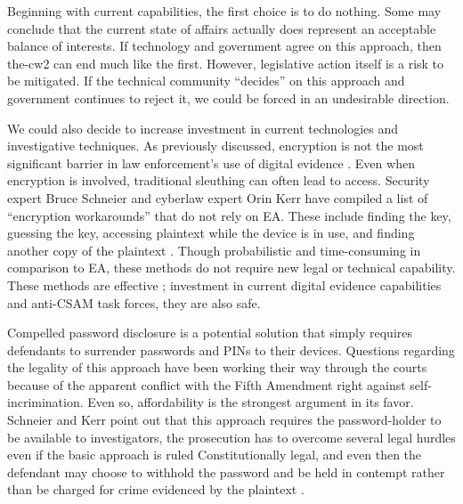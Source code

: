 Beginning with current capabilities, the first choice is to do nothing. Some may conclude that the current state of
affairs actually does represent an acceptable balance of interests. If technology and government agree on this approach,
then \ac{the-cw2} can end much like the first. However, legislative action itself is a risk to be mitigated. If the
technical community ``decides'' on this approach and government continues to reject it, we could be forced in an
undesirable direction.

We could also decide to increase investment in current technologies and investigative techniques. As previously
discussed, encryption is not the most significant barrier in law enforcement's use of digital evidence
\cite{carter_2018}. Even when encryption is involved, traditional sleuthing can often lead to access. Security expert
Bruce Schneier and cyberlaw expert Orin Kerr have compiled a list of ``encryption workarounds'' that do not rely on
\ac{EA}. These include finding the key, guessing the key, accessing plaintext while the device is in use, and finding
another copy of the plaintext \cite{kerr_encryption_2017}. Though probabilistic and time-consuming in comparison to
\ac{EA}, these methods do not require new legal or technical capability. These methods are effective
\cite{greenberg_2018}; investment in current digital evidence capabilities and anti-\ac{CSAM} task forces, they are also
safe.

Compelled password disclosure is a potential solution that simply requires defendants to surrender passwords and
\acp{PIN} to their devices. Questions regarding the legality of this approach have been working their way through the
courts \cite{bittenbender_2019} \cite{sobel_2019} because of the apparent conflict with the Fifth Amendment right
against self-incrimination. Even so, affordability is the strongest argument in its favor. Schneier and Kerr point out
that this approach requires the password-holder to be available to investigators, the prosecution has to overcome
several legal hurdles even if the basic approach is ruled Constitutionally legal, and even then the defendant may choose
to withhold the password and be held in contempt rather than be charged for crime evidenced by the plaintext
\cite{kerr_encryption_2017}.

